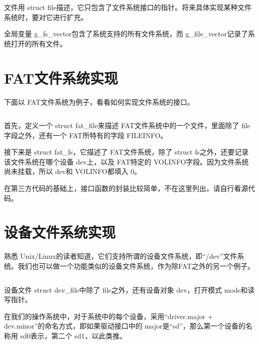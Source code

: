 \documentclass[main.tex]{subfiles}
\begin{document}
\begin{CJK*}{UTF8}{song}
\noindent
文件用 struct file描述，它只包含了文件系统接口的指针。将来具体实现某种文件系统时，要对它进行扩充。

\par
全局变量 g\_fs\_vector包含了系统支持的所有文件系统，而 g\_file\_vector记录了系统打开的所有文件。

\section{FAT文件系统实现}
下面以 FAT文件系统为例子，看看如何实现文件系统的接口。

\begin{code}
\label{code:6-4}
\inputminted[firstline=1337,lastline=1359,linenos,numbersep=5pt,frame=lines,framesep=2mm]{c}{src/chapter06/kernel/dosfs.c}
\end{code}

首先，定义一个 struct fat\_file来描述 FAT文件系统中的一个文件，里面除了 file字段之外，还有一个 FAT所特有的字段 FILEINFO。

\par
接下来是 struct fat\_fs，它描述了 FAT文件系统，除了 struct fs之外，还要记录该文件系统在哪个设备 dev上，以及 FAT特定的 VOLINFO字段。因为文件系统尚未挂载，所以 dev和 VOLINFO都填入 0。

\par
在第三方代码的基础上，接口函数的封装比较简单，不在这里列出，请自行看源代码。

\section{设备文件系统实现}
熟悉 Unix/Linux的读者知道，它们支持所谓的设备文件系统，即“/dev”文件系统。我们也可以做一个功能类似的设备文件系统，作为除FAT之外的另一个例子。

\begin{code}
\label{code:6-5}
\inputminted[firstline=12,lastline=31,linenos,numbersep=5pt,frame=lines,framesep=2mm]{c}{src/chapter06/kernel/devfs.c}
\end{code}

\noindent
设备文件 struct dev\_\-file中除了 file之外，还有设备对象 dev，打开模式 mode和读写指针。

\par
在我们的操作系统中，对于系统中的每个设备，采用“driver.major + dev.minor”的命名方式，即如果驱动接口中的 major是“sd”，那么第一个设备的名称用 sd0表示，第二个 sd1，以此类推。


\end{CJK*}
\end{document}
